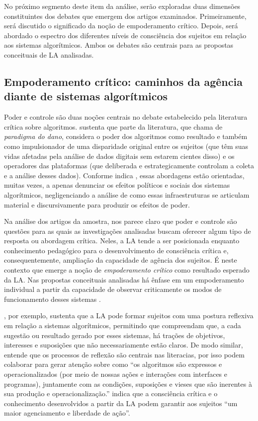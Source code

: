 No próximo segmento deste item da análise, serão exploradas duas
dimensões constituintes dos debates que emergem dos artigos examinados.
Primeiramente, será discutido o significado da noção de empoderamento
crítico. Depois, será abordado o espectro dos diferentes níveis de
consciência dos sujeitos em relação aos sistemas algorítmicos. Ambos os
debates são centrais para as propostas conceituais de LA analisadas.

\subsection{Empoderamento crítico: caminhos da agência diante de
sistemas algorítmicos}\label{sub-sec-empoderamentocritico}

Poder e controle são duas noções centrais no debate estabelecido pela
literatura crítica sobre algoritmos. \textcite{Magalhaes2018} sustenta que parte
da literatura, que chama de \emph{paradigma do dano}, considera o poder
dos algoritmos como resultado e também como impulsionador de uma
disparidade original entre os sujeitos (que têm suas vidas afetadas pela
análise de dados digitais sem estarem cientes disso) e os operadores das
plataformas (que deliberada e estrategicamente controlam a coleta e a
análise desses dados). Conforme indica \textcite{Rieder2018}, essas abordagens
estão orientadas, muitas vezes, a apenas denunciar os efeitos políticos
e sociais dos sistemas algorítmicos, negligenciando a análise de como
essas infraestruturas se articulam material e discursivamente para
produzir os efeitos de poder.

Na análise dos artigos da amostra, nos parece claro que poder e controle
são questões para as quais as investigações analisadas buscam oferecer
algum tipo de resposta ou abordagem crítica. Neles, a LA tende a ser
posicionada enquanto conhecimento pedagógico para o desenvolvimento de
consciência crítica e, consequentemente, ampliação da capacidade de
agência dos sujeitos. É neste contexto que emerge a noção de
\emph{empoderamento crítico} como resultado esperado da LA. Nas
propostas conceituais analisadas há ênfase em um empoderamento
individual a partir da capacidade de observar criticamente os modos de
funcionamento desses sistemas \cite{Bakke2020,Konig2022}.

\textcite{Konig2022}, por exemplo, sustenta que a LA pode formar sujeitos com
uma postura reflexiva em relação a sistemas algorítmicos, permitindo que
compreendam que, a cada sugestão ou resultado gerado por esses sistemas,
há trações de objetivos, interesses e suposições que não necessariamente
estão claros. De modo similar, \textcite[p.~1483]{Lloyd2019} entende que os
processos de reflexão são centrais nas literacias, por isso podem
colaborar para gerar atenção sobre como ``os algoritmos são expressos e
operacionalizados (por meio de nossas ações e interações com interfaces
e programas), juntamente com as condições, suposições e vieses que são
inerentes à sua produção e operacionalização.'' \textcite[p.~177]{Sued2022}
indica que a consciência crítica e o conhecimento desenvolvidos a partir
da LA podem garantir aos sujeitos ``um maior agenciamento e liberdade de
ação''.

